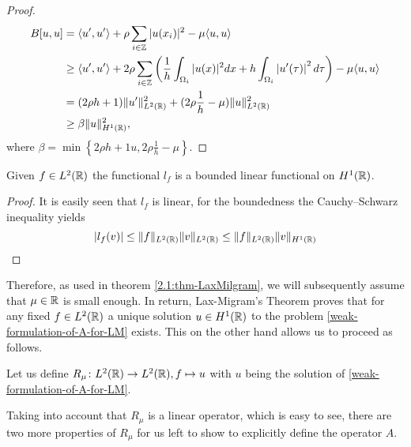\begin{theorem}
\begin{proof}
\begin{align*}
			B[u, u] & = \langle u' , u' \rangle + \rho \sum_{i \in \mathbb{Z}} |u(x_{i})|^{2} - \mu 	\langle u , u \rangle \\
					& \geq \langle u' , u' \rangle + 2 \rho \sum_{i \in \mathbb{Z}} \left( \frac{1}{h} \int_{\Omega_{i}} |u( x )|^{2} dx + h \int_{\Omega_{i}} \left| u'(\tau) \right|^{2} d\tau \right) - \mu \langle u , u \rangle \\
					& = (2 \rho h + 1) \| u' \|_{L^{2}(\mathbb{R})}^{2} + (2 \rho \frac{1}{h} - \mu) \| u \|_{L^{2}(\mathbb{R})}^{2}  \\
					& \geq \beta \| u \|_{H^{1}(\mathbb{R})}^{2},
		\end{align*}
		where $\beta = \min \left\{ 2 \rho h + 1u , 2 \rho \frac{1}{h} - \mu \right\}$.
	\end{proof}
\end{theorem}
\begin{theorem}
	Given $f \in L^{2}(\mathbb{R})$ the functional $l_{f}$ is a bounded linear functional on $H^{1}(\mathbb{R})$.
	
	\begin{proof}
		It is easily seen that $l_{f}$ is linear, for the boundedness the Cauchy–Schwarz inequality yields
		\[ | l_{f}(v) | \leq \| f \|_{L^{2}(\mathbb{R})} \| v \|_{L^{2}(\mathbb{R})} \leq \| f \|_{L^{2}(\mathbb{R})} \| v \|_{H^{1}(\mathbb{R})} \]
	\end{proof}
\end{theorem}
Therefore, as used in theorem \ref{2.1:thm-LaxMilgram}, we will subsequently assume that $\mu \in \mathbb{R}$ is small enough. In return, Lax-Migram's Theorem proves that for any fixed $f \in L^{2}(\mathbb{R})$ a unique solution $u \in H^{1}(\mathbb{R})$ to the problem \eqref{weak-formulation-of-A-for-LM} exists. This on the other hand allows us to proceed as follows.
\begin{definition}
	Let us define $R_{\mu} \colon L^{2}(\mathbb{R}) \rightarrow L^{2}(\mathbb{R}), f \mapsto u$ with $u$ being the solution of \eqref{weak-formulation-of-A-for-LM}.
\end{definition}
Taking into account that $R_{\mu}$ is a linear operator, which is easy to see, there are two more properties of $R_{\mu}$ for us left to show to explicitly define the operator $A$. 
